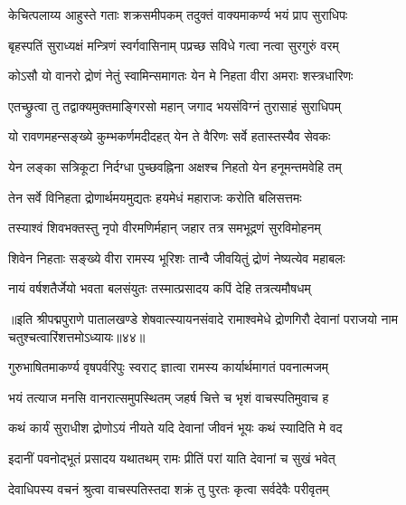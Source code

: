\twolineshloka
{केचित्पलाय्य आहुस्ते गताः शक्रसमीपकम्}
{तदुक्तं वाक्यमाकर्ण्य भयं प्राप सुराधिपः}%

\twolineshloka
{बृहस्पतिं सुराध्यक्षं मन्त्रिणं स्वर्गवासिनाम्}
{पप्रच्छ सविधे गत्वा नत्वा सुरगुरुं वरम्}%


\twolineshloka
{कोऽसौ यो वानरो द्रोणं नेतुं स्वामिन्समागतः}
{येन मे निहता वीरा अमराः शस्त्रधारिणः}%


\twolineshloka
{एतच्छ्रुत्वा तु तद्वाक्यमुक्तमाङ्गिरसो महान्}
{जगाद भयसंविग्नं तुरासाहं सुराधिपम्}%


\twolineshloka
{यो रावणमहन्सङ्ख्ये कुम्भकर्णमदीदहत्}
{येन ते वैरिणः सर्वे हतास्तस्यैव सेवकः}%

\twolineshloka
{येन लङ्का सत्रिकूटा निर्दग्धा पुच्छवह्निना}
{अक्षश्च निहतो येन हनूमन्तमवेहि तम्}%

\twolineshloka
{तेन सर्वे विनिहता द्रोणार्थमयमुद्यतः}
{हयमेधं महाराजः करोति बलिसत्तमः}%

\twolineshloka
{तस्याश्वं शिवभक्तस्तु नृपो वीरमणिर्महान्}
{जहार तत्र समभूद्रणं सुरविमोहनम्}%

\twolineshloka
{शिवेन निहताः सङ्ख्ये वीरा रामस्य भूरिशः}
{तान्वै जीवयितुं द्रोणं नेष्यत्येव महाबलः}%

\twolineshloka
{नायं वर्षशतैर्जेयो भवता बलसंयुतः}
{तस्मात्प्रसादय कपिं देहि तत्रत्यमौषधम्}%

{॥इति श्रीपद्मपुराणे पातालखण्डे शेषवात्स्यायनसंवादे रामाश्वमेधे द्रोणगिरौ देवानां पराजयो नाम चतुश्चत्वारिंशत्तमोऽध्यायः॥४४॥}

\resetShloka


\twolineshloka
{गुरुभाषितमाकर्ण्य वृषपर्वरिपुः स्वराट्}
{ज्ञात्वा रामस्य कार्यार्थमागतं पवनात्मजम्}%

\twolineshloka
{भयं तत्याज मनसि वानरात्समुपस्थितम्}
{जहर्ष चित्ते च भृशं वाचस्पतिमुवाच ह}%


\twolineshloka
{कथं कार्यं सुराधीश द्रोणोऽयं नीयते यदि}
{देवानां जीवनं भूयः कथं स्यादिति मे वद}%

\twolineshloka
{इदानीं पवनोद्भूतं प्रसादय यथातथम्}
{रामः प्रीतिं परां याति देवानां च सुखं भवेत्}%

\twolineshloka
{देवाधिपस्य वचनं श्रुत्वा वाचस्पतिस्तदा}
{शक्रं तु पुरतः कृत्वा सर्वदेवैः परीवृतम्}%

